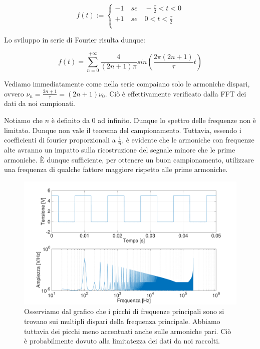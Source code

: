 \begin{displaymath}
f(t):=
\begin{cases}
-1 \quad se \quad -\frac{\tau}{2}<t<0 \\
+1 \quad se \quad 0<t<\frac{\tau}{2} \\ 
\end{cases}
\end{displaymath}

Lo sviluppo in serie di Fourier risulta dunque: 

\begin{equation}
f(t)=\sum_{n=0}^{+\infty}\frac{4}{(2n+1)\pi}sin (\frac{2\pi(2n+1)}{\tau}t)
\end{equation}

Vediamo immediatamente come nella serie compaiano solo le armoniche dispari, ovvero $\nu_n=\frac{2n+1}{\tau}=(2n+1)\nu_0$. Ciò è effettivamente verificato dalla FFT dei dati da noi campionati.

Notiamo che $n$ è definito da 0 ad infinito. Dunque lo spettro delle frequenze non è limitato. Dunque non vale il teorema del campionamento. Tuttavia, essendo i coefficienti di fourier proporzionali a $\frac{1}{n}$, è evidente che le armoniche con frequenze alte avranno un impatto sulla ricostruzione del segnale minore che le prime armoniche. È dunque sufficiente, per ottenere un buon campionamento, utilizzare una frequenza di qualche fattore maggiore rispetto alle prime armoniche. 





\begin{figure}[H]
\centering
	\includegraphics[width=.73\textwidth]{../E13/latex/quadra100hz@10000,200000.pdf}
	\caption{Osserviamo dal grafico che i picchi di frequenze principali sono si trovano sui multipli dispari della frequenza principale. Abbiamo tuttavia dei picchi meno accentuati anche sulle armoniche pari. Ciò è probabilmente dovuto alla limitatezza dei dati da noi raccolti.}
	\label{quadra}
\end{figure}


